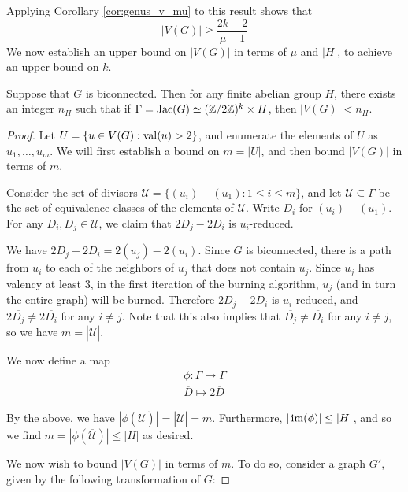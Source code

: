 \documentclass{amsart}
\begin{document}
Applying Corollary \ref{cor:genus_v_mu} to this result shows that 
\begin{equation*}
  |V(G)| \ge \frac{2k-2}{\mu - 1}
\end{equation*}
We now establish an upper bound on $|V(G)|$ in terms of $\mu$ and
$|H|$, to achieve an upper bound on $k$.

\begin{prop}
  \label{prop:v_bound}
  Suppose that $G$ is biconnected. Then for any finite abelian group
  $H$, there exists an integer $n_H$ such that if $\Gamma = \operatorname{Jac}(G)
  \simeq (\mathbb{Z}/2\mathbb{Z})^k \times H$, then $|V(G)| < n_H$.
\end{prop}

\begin{proof}
  Let $U = \{u \in V(G) : \operatorname{val}(u) > 2\}$, and enumerate the elements
  of $U$ as $u_1, \ldots, u_m$. We will first establish a bound on
  $m = |U|$, and then bound $|V(G)|$ in terms of $m$.
  
  Consider the set of divisors $\mathcal{U} = \{(u_i) - (u_1) : 1 \le
  i \le m\}$, and let $\overline{\mathcal{U}} \subseteq \Gamma$ be the
  set of equivalence classes of the elements of $\mathcal{U}$. Write
  $D_i$ for $(u_i) - (u_1)$. For any $D_i, D_j \in \mathcal{U}$, we
  claim that $2D_j - 2D_i$ is $u_i$-reduced.

  We have $2D_j - 2D_i = 2(u_j) - 2(u_i)$. Since $G$ is biconnected,
  there is a path from $u_i$ to each of the neighbors of $u_j$ that
  does not contain $u_j$. Since $u_j$ has valency at least $3$, in the
  first iteration of the burning algorithm, $u_j$ (and in turn the
  entire graph) will be burned. Therefore $2D_j - 2D_i$ is
  $u_i$-reduced, and $2\overline{D_j} \ne 2\overline{D_i}$ for any $i
  \ne j$. Note that this also implies that $\overline{D_j} \ne
  \overline{D_i}$ for any $i \ne j$, so we have
  $m=|\overline{\mathcal{U}}|$.

  We now define a map
  \begin{align*}
    \phi: \Gamma \to \Gamma \\
    \overline{D} \mapsto 2\overline{D}
  \end{align*}

  By the above, we have
  $|\phi(\overline{\mathcal{U}})|=|\overline{\mathcal{U}}|=m$. Furthermore,
  $|\operatorname{im}(\phi)| \le |H|$, and so we find
  $m=|\phi(\overline{\mathcal{U}})| \le |H|$ as desired.

  We now wish to bound $|V(G)|$ in terms of $m$. To do so, consider a
  graph $G'$, given by the following transformation of $G$:


\end{proof}
\end{document}
